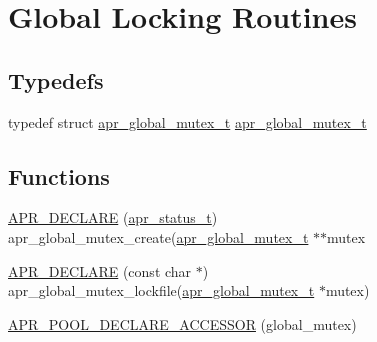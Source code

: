 \hypertarget{group___a_p_r___global_mutex}{}\section{Global Locking Routines}
\label{group___a_p_r___global_mutex}
\subsection*{Typedefs}
\begin{DoxyCompactItemize}
\item 
typedef struct \mbox{\hyperlink{structapr__global__mutex__t}{apr\+\_\+global\+\_\+mutex\+\_\+t}} \mbox{\hyperlink{group___a_p_r___global_mutex_ga3fc7dc5b076533ee566aa4888ac35ee7}{apr\+\_\+global\+\_\+mutex\+\_\+t}}
\end{DoxyCompactItemize}
\subsection*{Functions}
\begin{DoxyCompactItemize}
\item 
\mbox{\hyperlink{group___a_p_r___global_mutex_ga47ced81b7cf255f94aa0c2857abe5300}{A\+P\+R\+\_\+\+D\+E\+C\+L\+A\+RE}} (\mbox{\hyperlink{group__apr__errno_gaf76ee4543247e9fb3f3546203e590a6c}{apr\+\_\+status\+\_\+t}}) apr\+\_\+global\+\_\+mutex\+\_\+create(\mbox{\hyperlink{structapr__global__mutex__t}{apr\+\_\+global\+\_\+mutex\+\_\+t}} $\ast$$\ast$mutex
\item 
\mbox{\hyperlink{group___a_p_r___global_mutex_gae52583174fa4e71624db3d4e9d617861}{A\+P\+R\+\_\+\+D\+E\+C\+L\+A\+RE}} (const char $\ast$) apr\+\_\+global\+\_\+mutex\+\_\+lockfile(\mbox{\hyperlink{structapr__global__mutex__t}{apr\+\_\+global\+\_\+mutex\+\_\+t}} $\ast$mutex)
\item 
\mbox{\hyperlink{group___a_p_r___global_mutex_ga722d0f9777257de10d37d174468bc881}{A\+P\+R\+\_\+\+P\+O\+O\+L\+\_\+\+D\+E\+C\+L\+A\+R\+E\+\_\+\+A\+C\+C\+E\+S\+S\+OR}} (global\+\_\+mutex)
\end{DoxyCompactItemize}

